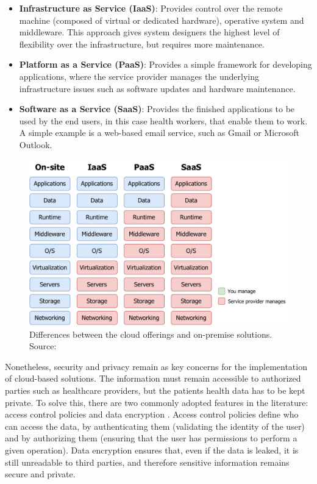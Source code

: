 \begin{itemize}
    \item \textbf{Infrastructure as Service (IaaS)}: Provides control over the remote machine (composed of virtual or dedicated hardware), operative system and middleware. This approach gives system designers the highest level of flexibility over the infrastructure, but requires more maintenance.
    \item \textbf{Platform as a Service (PaaS)}: Provides a simple framework for developing applications, where the service provider manages the underlying infrastructure issues such as software updates and hardware maintenance. 
    \item \textbf{Software as a Service (SaaS)}: Provides the finished applications to be used by the end users, in this case health workers, that enable them to work. A simple example is a web-based email service, such as Gmail or Microsoft Outlook. 
\end{itemize}

\begin{figure}[H]
    \centering
    \includegraphics[width=0.8\linewidth]{images/cloud-services.pdf}
    \caption[Differences between the cloud offerings and on-premise solutions.]{ Differences between the cloud offerings and on-premise solutions. Source: \cite{RedHat2021}}
    \label{fig:differences-between-cloud-services}
\end{figure}


Nonetheless, security and privacy remain as key concerns for the implementation of cloud-based solutions. The information must remain accessible to authorized parties such as healthcare providers, but the patients health data has to be kept private. To solve this, there are two commonly adopted features in the literature: access control policies and data encryption \cite{Baker2017}. Access control policies define who can access the data, by authenticating them (validating the identity of the user) and by authorizing them (ensuring that the user has permissions to perform a given operation). Data encryption ensures that, even if the data is leaked, it is still unreadable to third parties, and therefore sensitive information remains secure and private. \bigskip

